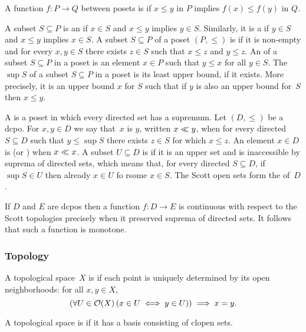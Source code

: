 A function $f : P \to Q$ between posets is  if $x \leq
y$ in $P$ implies $f(x) \leq f(y)$ in $Q$.

A subset $S \subseteq P$ is an  if $x \in S$ and $x
\leq y$ implies $y \in S$. Similarly, it is a  if $y
\in S$ and $x \leq y$ implies $x \in S$.
%
A subset $S \subseteq P$ of a poset $(P, {\leq})$ is 
if it is non-empty and for every $x, y \in S$ there exists $z \in S$
such that $x \leq z$ and $y \leq z$.
%
An  of a subset $S \subseteq P$ in a poset is an
element $x \in P$ such that $y \leq x$ for all $y \in S$.
%
The  $\sup S$ of a subset $S \subseteq P$ in a poset is
its least upper bound, if it exists. More precisely, it is an upper
bound $x$ for $S$ such that if $y$ is also an upper bound for~$S$ then
$x \leq y$.

A  is a poset in which
every directed set has a supremum. Let $(D, {\leq})$ be a dcpo. For
$x, y \in D$ we say that~$x$ is  $y$, written $x \ll
y$, when for every directed $S \subseteq D$ such that $y \leq \sup S$
there exists $z \in S$ for which $x \leq z$. An element $x \in D$ is
 (or ) when $x \ll x$. A subset $U
\subseteq D$ is  if it is an upper set and is
inaccessible by suprema of directed sets, which means that, for every
directed $S \subseteq D$, if $\sup S \in U$ then already $x \in U$ fo
rsome $x \in S$. The Scott open sets form the 
of~$D$.

If $D$ and $E$ are dcpos then a function $f : D \to E$ is continuous
with respect to the Scott topologies precisely when it preserved
suprema of directed sets. It follows that such a function is monotone.


\subsubsection*{Topology}

A topological space~$X$ is  if each point is
uniquely determined by its open neighborhoods: for all $x, y \in
X$,
%
\begin{equation*}
  (\forall U \in \mathcal{O}(X) \, (x \in U \iff y \in U)) \implies x = y.
\end{equation*}

A topological space is  if it has a basis
consisting of clopen sets.






